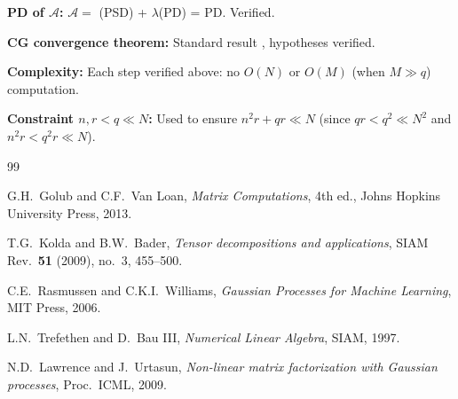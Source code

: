 \documentclass[12pt]{article}
\begin{document}
\textbf{PD of $\mathcal{A}$:} $\mathcal{A} = $ (PSD) + $\lambda$(PD) = PD. Verified.

\textbf{CG convergence theorem:} Standard result \cite[Theorem 6.29]{Trefethen1997}, hypotheses verified.

\textbf{Complexity:} Each step verified above: no $O(N)$ or $O(M)$ (when $M \gg q$) computation.

\textbf{Constraint $n, r < q \ll N$:} Used to ensure $n^2 r + qr \ll N$ (since $qr < q^2 \ll N^2$ and $n^2 r < q^2 r \ll N$).

\begin{thebibliography}{99}

G.H.\ Golub and C.F.\ Van Loan,
\textit{Matrix Computations}, 4th ed.,
Johns Hopkins University Press, 2013.

T.G.\ Kolda and B.W.\ Bader,
\textit{Tensor decompositions and applications},
SIAM Rev.\ \textbf{51} (2009), no.\ 3, 455--500.

C.E.\ Rasmussen and C.K.I.\ Williams,
\textit{Gaussian Processes for Machine Learning},
MIT Press, 2006.

L.N.\ Trefethen and D.\ Bau III,
\textit{Numerical Linear Algebra},
SIAM, 1997.

N.D.\ Lawrence and J.\ Urtasun,
\textit{Non-linear matrix factorization with Gaussian processes},
Proc.\ ICML, 2009.

\end{thebibliography}
\end{document}
